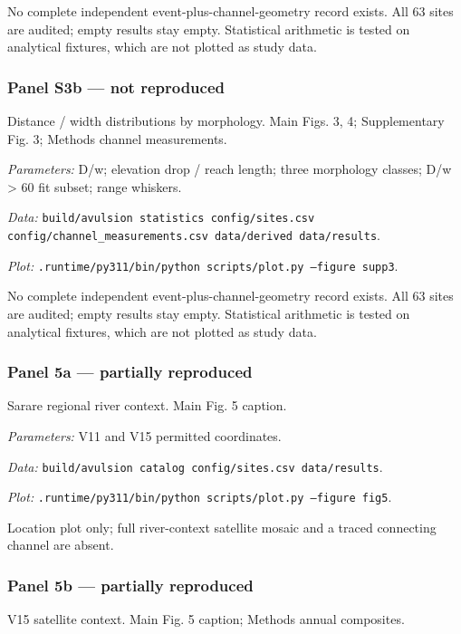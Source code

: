 No complete independent event-plus-channel-geometry record exists. All 63 sites are audited; empty results stay empty. Statistical arithmetic is tested on analytical fixtures, which are not plotted as study data.

\subsubsection*{Panel S3b --- not reproduced}
Distance / width distributions by morphology. Main Figs. 3, 4; Supplementary Fig. 3; Methods channel measurements.

\textit{Parameters:} D/w; elevation drop / reach length; three morphology classes; D/w > 60 fit subset; range whiskers.

\textit{Data:} \texttt{build/\allowbreak{}avulsion statistics config/\allowbreak{}sites.csv config/\allowbreak{}channel\_measurements.csv data/\allowbreak{}derived data/\allowbreak{}results}.

\textit{Plot:} \texttt{.runtime/\allowbreak{}py311/\allowbreak{}bin/\allowbreak{}python scripts/\allowbreak{}plot.py --figure supp3}.

No complete independent event-plus-channel-geometry record exists. All 63 sites are audited; empty results stay empty. Statistical arithmetic is tested on analytical fixtures, which are not plotted as study data.

\subsubsection*{Panel 5a --- partially reproduced}
Sarare regional river context. Main Fig. 5 caption.

\textit{Parameters:} V11 and V15 permitted coordinates.

\textit{Data:} \texttt{build/\allowbreak{}avulsion catalog config/\allowbreak{}sites.csv data/\allowbreak{}results}.

\textit{Plot:} \texttt{.runtime/\allowbreak{}py311/\allowbreak{}bin/\allowbreak{}python scripts/\allowbreak{}plot.py --figure fig5}.

Location plot only; full river-context satellite mosaic and a traced connecting channel are absent.

\subsubsection*{Panel 5b --- partially reproduced}
V15 satellite context. Main Fig. 5 caption; Methods annual composites.

